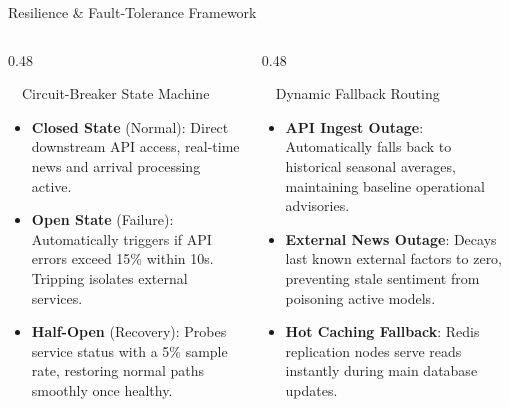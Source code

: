 \documentclass{beamer}
\begin{document}
\begin{frame}{Resilience \& Fault-Tolerance Framework}
\vspace{-0.2cm}

\begin{columns}[T]
    \begin{column}{0.48\textwidth}
        \begin{alertcard}[height=5.2cm]{~~Circuit-Breaker State Machine}
            \fontsize{6.8pt}{8.5pt}\selectfont
            \begin{itemize}\setlength\itemsep{3pt}\setlength\parskip{0pt}
                \item \textbf{Closed State} (Normal): Direct downstream API access, real-time news and arrival processing active.
                \item \textbf{Open State} (Failure): Automatically triggers if API errors exceed 15\% within 10s. Tripping isolates external services.
                \item \textbf{Half-Open} (Recovery): Probes service status with a 5\% sample rate, restoring normal paths smoothly once healthy.
            \end{itemize}
        \end{alertcard}
    \end{column}
    
    \begin{column}{0.48\textwidth}
        \begin{successcard}[height=5.2cm]{~~Dynamic Fallback Routing}
            \fontsize{6.8pt}{8.2pt}\selectfont
            \begin{itemize}\setlength\itemsep{3.5pt}\setlength\parskip{0pt}
                \item \textbf{API Ingest Outage}: Automatically falls back to historical seasonal averages, maintaining baseline operational advisories.
                \item \textbf{External News Outage}: Decays last known external factors to zero, preventing stale sentiment from poisoning active models.
                \item \textbf{Hot Caching Fallback}: Redis replication nodes serve reads instantly during main database updates.
            \end{itemize}
        \end{successcard}
    \end{column}
\end{columns}


\end{frame}
\end{document}
